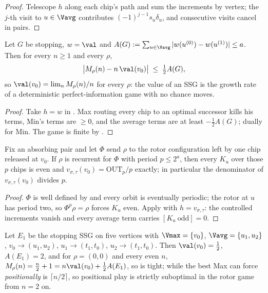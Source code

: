 \begin{proof}
Telescope $h$ along each chip's path and sum the increments by vertex; the
$j$-th visit to $u\in\Vavg$ contributes $(-1)^{j-1}s_u\delta_u$, and consecutive
visits cancel in pairs.
\end{proof}

\begin{corollary}\label{fresh19:cor-sandwich}
Let $G$ be stopping, $w=\val$ and
$A(G):=\sum_{u\in\Vavg}|w(u^{(0)})-w(u^{(1)})|\le a$.  Then for every $n\ge1$
and every $\rho$,
\[
   \bigl|M_\rho(n)-n\,\val(v_0)\bigr|\;\le\;\tfrac12A(G),
\]
so $\val(v_0)=\lim_n M_\rho(n)/n$ for every $\rho$: the value of an SSG is the
growth rate of a deterministic perfect-information game with no chance moves.
\end{corollary}

\begin{proof}
Take $h=w$ in .  Max routing every chip to an optimal
successor kills his terms, Min's terms are $\ge0$, and the average terms are at
least $-\tfrac12A(G)$; dually for Min.  The game is finite by
.
\end{proof}

\begin{theorem}\label{fresh19:thm-period}
Fix an absorbing pair and let $\Phi$ send $\rho$ to the rotor configuration left
by one chip released at $v_0$.  If $\rho$ is recurrent for $\Phi$ with period
$p\le2^{a}$, then every $K_u$ over those $p$ chips is even and
$v_{\sigma,\tau}(v_0)=\mathrm{OUT}_p/p$ exactly; in particular the denominator
of $v_{\sigma,\tau}(v_0)$ divides $p$.
\end{theorem}

\begin{proof}
$\Phi$ is well defined by  and every orbit is
eventually periodic; the rotor at $u$ has period two, so $\Phi^{p}\rho=\rho$
forces $K_u$ even.  Apply  with
$h=v_{\sigma,\tau}$: the controlled increments vanish and every average term
carries $[K_u\ \text{odd}]=0$.
\end{proof}

\begin{proposition}\label{fresh19:prop-lossy}
Let $E_1$ be the stopping SSG on five vertices with $\Vmax=\{v_0\}$,
$\Vavg=\{u_1,u_2\}$, $v_0\to(u_1,u_2)$, $u_1\to(t_1,t_0)$, $u_2\to(t_1,t_0)$.
Then $\val(v_0)=\tfrac12$, $A(E_1)=2$, and for $\rho=(0,0)$ and every even $n$,
$M_\rho(n)=\tfrac n2+1=n\val(v_0)+\tfrac12A(E_1)$, so
 is tight; while the best Max can force
\emph{positionally} is $\lceil n/2\rceil$, so positional play is strictly
suboptimal in the rotor game from $n=2$ on.
\end{proposition}

